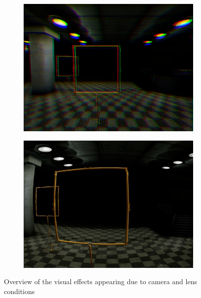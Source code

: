\begin{figure}[bhtp]
	\begin{subfigure}{0.33\textwidth}
	\includegraphics[width=\textwidth]{fig/gate_example_chromatic}
	\label{fig:chromatic}
\end{subfigure}
\begin{subfigure}{0.33\textwidth}
	\includegraphics[width=\textwidth]{fig/gate_example_distorted}
	\label{fig:distortion}
\end{subfigure}

\caption{Overview of the visual effects appearing due to camera and lens conditions}\label{fig:vis_overview}
\end{figure}


